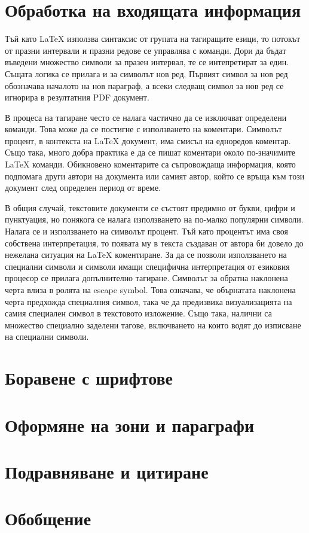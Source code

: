 \section{Обработка на входящата информация}

Тъй като LaTeX използва синтаксис от групата на тагиращите езици, то потокът от празни интервали и празни редове се управлява с команди. Дори да бъдат въведени множество символи за празен интервал, те се интепретират за един. Същата логика се прилага и за символът нов ред. Първият символ за нов ред обозначава началото на нов параграф, а всеки следващ символ за нов ред се игнорира в резултатния PDF документ. 

В процеса на тагиране често се налага частично да се изключват определени команди. Това може да се постигне с използването на коментари. Символът процент, в контекста на LaTeX документ, има смисъл на едноредов коментар. Също така, много добра практика е да се пишат коментари около по-значимите LaTeX команди. Обикновено коментарите са съпровождаща информация, която подпомага други автори на документа или самият автор, който се връща към този документ след определен период от време. 

В общия случай, текстовите документи се състоят предимно от букви, цифри и пунктуация, но понякога се налага използването на по-малко популярни символи. Налага се и използването на символът процент. Тъй като процентът има своя собствена интерпретация, то появата му в текста създаван от автора би довело до нежелана ситуация на LaTeX коментиране. За да се позволи използването на специални символи и символи имащи специфична интерпретация от езиковия процесор се прилага допълнително тагиране. Символът за обратна наклонена черта влиза в ролята на escape symbol. Това означава, че обърнатата наклонена черта предхожда специалния символ, така че да предизвика визуализацията на самия специален символ в текстовото изложение. Също така, налични са множество специално заделени тагове, включването на които водят до изписване на специални символи. 

\section{Боравене с шрифтове}



\section{Оформяне на зони и параграфи}



\section{Подравняване и цитиране}



\section*{Обобщение}



